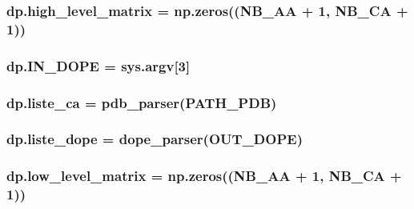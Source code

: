 \subsubsection[{\texorpdfstring{high\+\_\+level\+\_\+matrix}{high_level_matrix}}]{\setlength{\rightskip}{0pt plus 5cm}dp.\+high\+\_\+level\+\_\+matrix = np.\+zeros(({\bf N\+B\+\_\+\+AA} + 1, {\bf N\+B\+\_\+\+CA} + 1))}\hypertarget{namespacedp_a10f426d4279ac852904b43e0ee3eb227}{}\label{namespacedp_a10f426d4279ac852904b43e0ee3eb227}
\subsubsection[{\texorpdfstring{I\+N\+\_\+\+D\+O\+PE}{IN_DOPE}}]{\setlength{\rightskip}{0pt plus 5cm}dp.\+I\+N\+\_\+\+D\+O\+PE = sys.\+argv\mbox{[}3\mbox{]}}\hypertarget{namespacedp_aacf1b000f9c49b46ee694751ae77dceb}{}\label{namespacedp_aacf1b000f9c49b46ee694751ae77dceb}
\subsubsection[{\texorpdfstring{liste\+\_\+ca}{liste_ca}}]{\setlength{\rightskip}{0pt plus 5cm}dp.\+liste\+\_\+ca = {\bf pdb\+\_\+parser}({\bf P\+A\+T\+H\+\_\+\+P\+DB})}\hypertarget{namespacedp_ae299bf173b08073dea4a36c55212f3d5}{}\label{namespacedp_ae299bf173b08073dea4a36c55212f3d5}
\subsubsection[{\texorpdfstring{liste\+\_\+dope}{liste_dope}}]{\setlength{\rightskip}{0pt plus 5cm}dp.\+liste\+\_\+dope = {\bf dope\+\_\+parser}({\bf O\+U\+T\+\_\+\+D\+O\+PE})}\hypertarget{namespacedp_a73f0f6fe49c927039bc37d60141be62a}{}\label{namespacedp_a73f0f6fe49c927039bc37d60141be62a}
\subsubsection[{\texorpdfstring{low\+\_\+level\+\_\+matrix}{low_level_matrix}}]{\setlength{\rightskip}{0pt plus 5cm}dp.\+low\+\_\+level\+\_\+matrix = np.\+zeros(({\bf N\+B\+\_\+\+AA} + 1, {\bf N\+B\+\_\+\+CA} + 1))}\hypertarget{namespacedp_aff0473794a64988faf25a2fd5199c6e8}{}\label{namespacedp_aff0473794a64988faf25a2fd5199c6e8}
